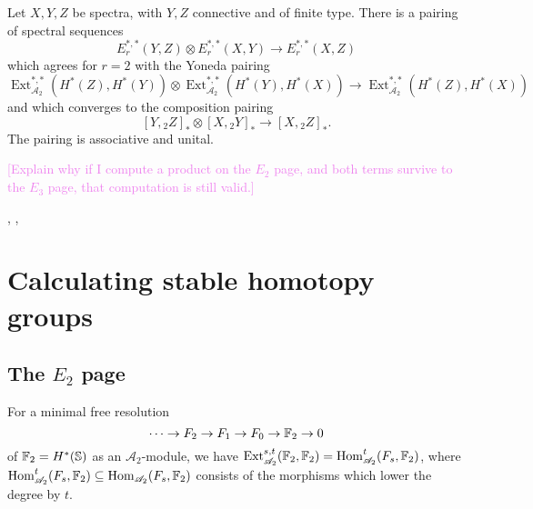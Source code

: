 \documentclass{MetricNotes2023}
\def\bb{\ensuremath\mathbb}
\def\subq{\ensuremath\subseteq}
\def\A{\ensuremath{\mathscr{A}_2}}
\DeclareMathOperator{\Ext}{Ext}
\DeclareMathOperator{\Hom}{Hom}
\def\textcolour{\textcolor}
\begin{document}
\begin{theorem}
Let \(X,Y,Z\) be spectra, with \(Y, Z\) connective and of finite type. There is a pairing of spectral sequences
\[E^{*,*}_r(Y,Z)\otimes E^{*,*}_r(X,Y)\to E^{*,*}_r(X,Z)\]
which agrees for \(r=2\) with the Yoneda pairing
\[\Ext^{*,*}_{\A}(H^*(Z), H^*(Y))\otimes \Ext_{\A}^{*,*}(H^*(Y), H^*(X))\to \Ext_{\A}^{*,*}(H^*(Z), H^*(X))\]
and which converges %
to the composition pairing
\[[Y, \text{}_2Z]_*\otimes [X,\text{}_2Y]_* \to [X, \text{}_2Z]_*.\]
The pairing is associative and unital.
\end{theorem}

\textcolour{violet}{[Explain why if I compute a product on the \(E_2\) page, and both terms survive to the \(E_3\) page, that computation is still valid.]}

\autocite{ass}, \autocite{rognes2}, \autocite{spectra}

\section{Calculating stable homotopy groups}

\subsection{The \(E_2\) page}

\begin{lemma}\label{2503171645shutupitsbeenalongterm}
For a minimal free resolution 
\[\cdots \to F_2 \to F_1 \to F_0 \to \bb{F}_2 \to 0\]
of \(\bb{F}_2=H^*(\bb{S})\) as an \(\A\)-module, we have \(\Ext_{\A}^{s,t}(\bb{F}_2, \bb{F}_2)=\Hom^t_{\A}(F_s, \bb{F}_2)\), where \(\Hom^t_{\A}(F_s, \bb{F}_2)\subq \Hom_{\A}(F_s, \bb{F}_2)\) consists of the morphisms which lower the degree by \(t\).
\end{lemma}
\end{document}
